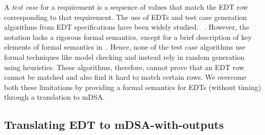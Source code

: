 

A \emph{test case} for a requirement is a sequence of values  that match the
EDT row corresponding to that requirement. The use of EDTs and test case generation
algorithms from EDT specifications have been widely studied.
~\cite{DBLP:conf/enase/VenkateshSZA15a,DBLP:conf/icst/AgrawalVSZV20}. However, the notation lacks a rigorous
formal semantics, except for a brief description of key elements of formal
semantics in~\cite{DBLP:conf/date/VenkateshSKA14}. Hence, none of the test case algorithms use
formal techniques like model checking and instead rely in random generation
using heuristics. These algorithms, therefore, cannot prove that an EDT row
cannot be matched and also find it hard to match certain rows. We overcome both
these limitations by providing a formal semantics for EDTs (without timing)
through a translation to mDSA.

\subsection{Translating EDT to mDSA-with-outputs}

